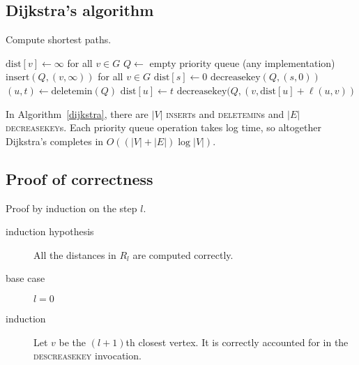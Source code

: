 \subsection{Dijkstra's algorithm}
\begin{algorithm}
	\caption{Compute shortest paths.}
	\label{dijkstra}
	\begin{algorithmic}
			\State \(\text{dist}[v] \leftarrow \infty\) for all \(v \in G\)
			\State \(Q\leftarrow\) empty priority queue (any implementation)
			\State \(\text{insert}(Q, (v, \infty))\) for all \(v \in G\)
			\State \(\text{dist}[s] \leftarrow 0\)
			\State \(\text{decreasekey}(Q, (s, 0))\)
				\State \((u, t)\leftarrow \text{deletemin}(Q)\)
				\State \(\text{dist}[u] \leftarrow t\)
						\State \(\text{decreasekey}(Q, (v, \text{dist}[u] + \ell(u, v))\)
					\EndIf
				\EndFor
			\EndWhile
		\EndFunction
	\end{algorithmic}
\end{algorithm}

In Algorithm~\ref{dijkstra}, there are \(\left|V\right|\) \textsc{insert}s and \textsc{deletemin}s and \(\left|E\right|\) \textsc{decreasekey}s.
Each priority queue operation takes log time, so altogether Dijkstra's
completes in \(O\left(\left(\left|V\right| + \left|E\right|\right)\log \left|V\right|\right)\).

\subsection{Proof of correctness}

Proof by induction on the step \(l\).
\begin{description}
	\item[induction hypothesis] All the distances in \(R_l\) are computed correctly.
	\item[base case] \(l = 0\)
	\item[induction] Let \(v\) be the \((l + 1)\)th closest vertex. It is correctly accounted for in the \textsc{descreasekey} invocation.
\end{description}
